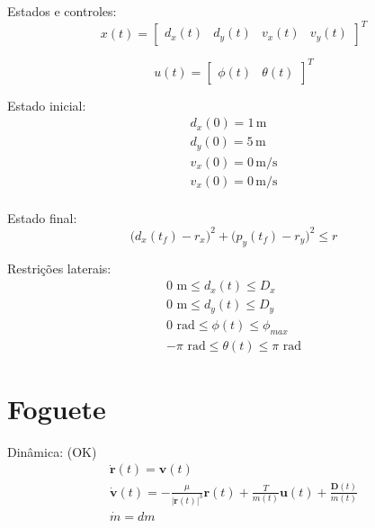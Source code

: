 \documentclass[10pt,a4paper]{article}
\begin{document}
	Estados e controles:
	\begin{equation}
	x(t) = \begin{bmatrix} d_x(t) & d_y(t) & v_x(t) & v_y(t) \end{bmatrix}^T
	\end{equation}
	
	\begin{equation}
	u(t) = \begin{bmatrix} \phi(t) & \theta(t) \end{bmatrix}^T
	\end{equation}
	
	Estado inicial:
	\begin{equation}
		\begin{gathered}
			d_x(0) = 1 \, \text{m} \\
			d_y(0) = 5 \, \text{m} \\
			v_x(0) = 0 \, \text{m/s} \\
			v_x(0) = 0 \, \text{m/s} \\
		\end{gathered}
	\end{equation}
	
	Estado final:
	\begin{equation}
		\big( d_x(t_f) - r_x \big)^2 + \big( p_y(t_f) - r_y \big)^2 \leq r
	\end{equation}
	
	Restrições laterais:
	\begin{equation}
		\begin{gathered}
			0 \text{ m} \leq d_x(t) \leq D_x \\
			0 \text{ m} \leq d_y(t) \leq D_y \\
			0 \text{ rad} \leq \phi(t) \leq \phi_{max} \\
			-\pi \text{ rad} \leq \theta(t) \leq \pi \text{ rad}
		\end{gathered}
	\end{equation}
	
	\section{Foguete}
	
	Dinâmica: (OK)
	\begin{equation}
		\begin{gathered}
			\dot{\mathbf{r}}(t) = \mathbf{v}(t) \\
			\dot{\mathbf{v}}(t) = -\frac{\mu}{|\mathbf{r}(t)|^3} \mathbf{r}(t) + \frac{T}{m(t)} \mathbf{u}(t) + \frac{\mathbf{D}(t)}{m(t)} \\
			\dot{m} = dm
		\end{gathered}
	\end{equation}
	
\end{document}
